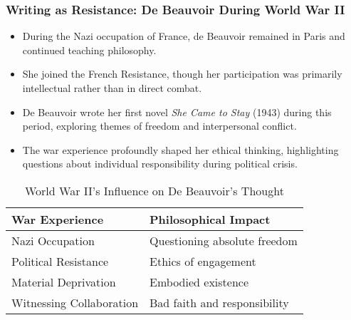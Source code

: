 \documentclass[aspectratio=169]{beamer}
\begin{document}
	\begin{frame}
		\frametitle{Writing as Resistance: De Beauvoir During World War II}
		\begin{itemize}
			\item During the Nazi occupation of France, de Beauvoir remained in Paris and continued teaching philosophy.
			\item She joined the French Resistance, though her participation was primarily intellectual rather than in direct combat.
			\item De Beauvoir wrote her first novel \textit{She Came to Stay} (1943) during this period, exploring themes of freedom and interpersonal conflict.
			\item The war experience profoundly shaped her ethical thinking, highlighting questions about individual responsibility during political crisis.
		\end{itemize}
		
		\begin{table}
			\begin{tabular}{ll}
				\toprule
				\textbf{War Experience} & \textbf{Philosophical Impact} \\
				\midrule
				Nazi Occupation & Questioning absolute freedom \\
				Political Resistance & Ethics of engagement \\
				Material Deprivation & Embodied existence \\
				Witnessing Collaboration & Bad faith and responsibility \\
				\bottomrule
			\end{tabular}
			\caption{World War II's Influence on De Beauvoir's Thought}
		\end{table}
	\end{frame}
	
\end{document}
